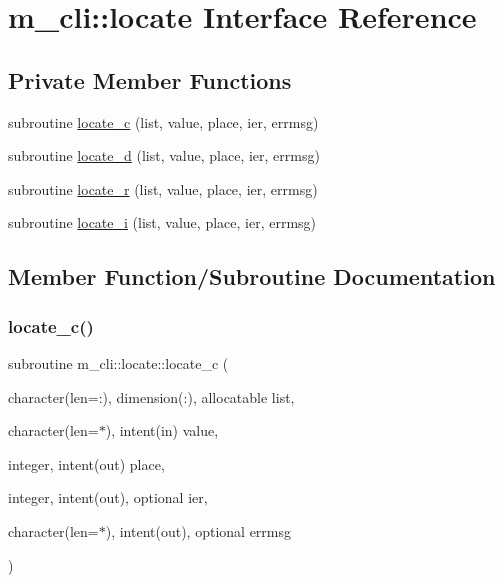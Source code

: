 \hypertarget{interfacem__cli_1_1locate}{}\section{m\+\_\+cli\+:\+:locate Interface Reference}
\label{interfacem__cli_1_1locate}
\subsection*{Private Member Functions}
\begin{DoxyCompactItemize}
\item 
subroutine \mbox{\hyperlink{interfacem__cli_1_1locate_a785f3dd46c06df9527629c691153a30b}{locate\+\_\+c}} (list, value, place, ier, errmsg)
\item 
subroutine \mbox{\hyperlink{interfacem__cli_1_1locate_a71019028d011617570317ae09899b86a}{locate\+\_\+d}} (list, value, place, ier, errmsg)
\item 
subroutine \mbox{\hyperlink{interfacem__cli_1_1locate_a128461b6770cea9575da2b98f9803dfb}{locate\+\_\+r}} (list, value, place, ier, errmsg)
\item 
subroutine \mbox{\hyperlink{interfacem__cli_1_1locate_af977558244f03daa06eef8520a5475cc}{locate\+\_\+i}} (list, value, place, ier, errmsg)
\end{DoxyCompactItemize}


\subsection{Member Function/\+Subroutine Documentation}
\mbox{\label{interfacem__cli_1_1locate_a785f3dd46c06df9527629c691153a30b}} 
\subsubsection{\texorpdfstring{locate\+\_\+c()}{locate\_c()}}
{\footnotesize\ttfamily subroutine m\+\_\+cli\+::locate\+::locate\+\_\+c (\begin{DoxyParamCaption}\item[{character(len=\+:), dimension(\+:), allocatable}]{list,  }\item[{character(len=$\ast$), intent(in)}]{value,  }\item[{integer, intent(out)}]{place,  }\item[{integer, intent(out), optional}]{ier,  }\item[{character(len=$\ast$), intent(out), optional}]{errmsg }\end{DoxyParamCaption})\hspace{0.3cm}{\ttfamily [private]}}

